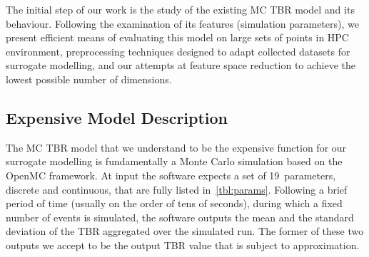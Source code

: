 The initial step of our work is the study of the existing MC TBR model and its
behaviour. Following the examination of its features (simulation parameters), we
present efficient means of evaluating this model on large sets of points in HPC
environment, preprocessing techniques designed to adapt collected datasets for
surrogate modelling, and our attempts at feature space reduction to achieve the
lowest possible number of dimensions.


\subsection{Expensive Model Description}
\label{sec:expensive-model-description}

The MC TBR model that we understand to be the expensive function for our
surrogate modelling is fundamentally a Monte Carlo simulation based on the OpenMC
framework. At input the software expects a set of 19~parameters, discrete and
continuous, that are fully listed in~\cref{tbl:params}. Following a brief period of
time (usually on the order of tens of seconds), during which a fixed number of events is simulated, the software outputs the
mean and the standard deviation of the TBR aggregated over the simulated run. The
former of these two outputs we accept to be the output TBR value that is subject
to approximation.

